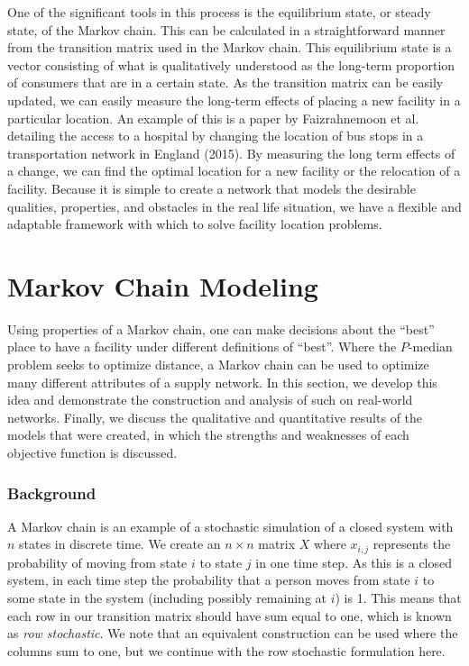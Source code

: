 \documentclass[twoside,twocolumn]{article}
\begin{document}
One of the significant tools in this process is the equilibrium state, or steady state, of the Markov chain.
This can be calculated in a straightforward manner from the transition matrix used in the Markov chain.
This equilibrium state is a vector consisting of what is qualitatively understood as the long-term proportion of consumers that are in a certain state. %
As the transition matrix can be easily updated, we can easily measure the long-term effects of placing a new facility in a particular location.
An example of this is a paper by Faizrahnemoon et al. detailing the access to a hospital by changing the location of bus stops in a transportation network in England (2015).
By measuring the long term effects of a change, we can find the optimal location for a new facility or the relocation of a facility.
Because it is simple to create a network that models the desirable qualities, properties, and obstacles in the real life situation, we have a flexible and adaptable framework with which to solve facility location problems.

\section{Markov Chain Modeling}

Using properties of a Markov chain, one can make decisions about the ``best'' place to have a facility under different definitions of ``best''.
Where the $P$-median problem seeks to optimize distance, a Markov chain can be used to optimize many different attributes of a supply network.
In this section, we develop this idea and demonstrate the construction and analysis of such on real-world networks.
Finally, we discuss the qualitative and quantitative results of the models that were created, in which the strengths and weaknesses of each objective function is discussed.

\subsubsection{Background}

A Markov chain is an example of a stochastic simulation of a closed system with $n$ states in discrete time.
We create an $n\times n$ matrix $X$ where $x_{i,j}$ represents the probability of moving from state $i$ to state $j$ in one time step.
As this is a closed system, in each time step the probability that a person moves from state $i$ to some state in the system (including possibly remaining at $i$) is 1. 
This means that each row in our transition matrix should have sum equal to one, which is known as {\em row stochastic}.
We note that an equivalent construction can be used where the columns sum to one, but we continue with the row stochastic formulation here.%
\end{document}
